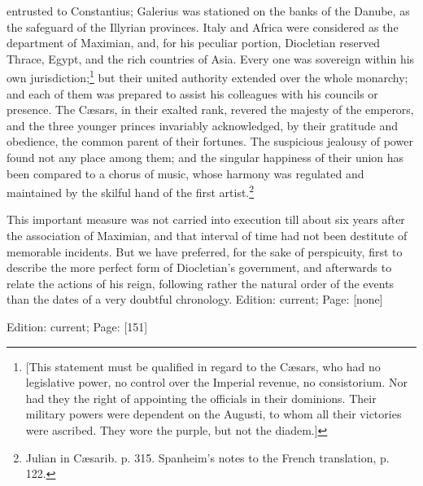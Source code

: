 entrusted to Constantius; Galerius was stationed on the banks of the Danube, as the safeguard of the Illyrian provinces. Italy and Africa were considered as the department of Maximian, and, for his peculiar portion, Diocletian reserved Thrace, Egypt, and the rich countries of Asia. Every one was sovereign within his own jurisdiction;\footnote{[This statement must be qualified in regard to the Cæsars, who had no legislative power, no control over the Imperial revenue, no consistorium. Nor had they the right of appointing the officials in their dominions. Their military powers were dependent on the Augusti, to whom all their victories were ascribed. They wore the purple, but not the diadem.]} but their united authority extended over the whole monarchy; and each of them was prepared to assist his colleagues with his councils or presence. The Cæsars, in their exalted rank, revered the majesty of the emperors, and the three younger princes invariably acknowledged, by their gratitude and obedience, the common parent of their fortunes. The suspicious jealousy of power found not any place among them; and the singular happiness of their union has been compared to a chorus of music, whose harmony was regulated and maintained by the skilful hand of the first artist.\footnote{Julian in Cæsarib. p. 315. Spanheim\texthebrew{}’s notes to the French translation, p. 122.}

This important measure was not carried into execution till about six years after the association of Maximian, and that interval of time had not been destitute of memorable incidents. But we have preferred, for the sake of perspicuity, first to describe the more perfect form of Diocletian\texthebrew{}’s government, and afterwards to relate the actions of his reign, following rather the natural order of the events than the dates of a very doubtful chronology.
Edition: current; Page: [none]

Edition: current; Page: [151]

